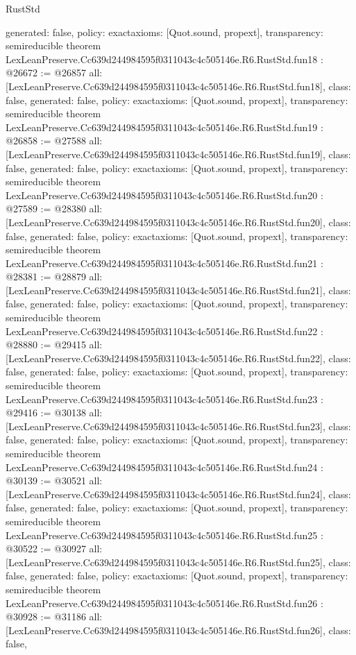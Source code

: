 \begin{lexlean}{RustStd}
\begin{coremodule}
{  generated: false,
  policy: exact{axioms: [Quot.sound, propext]},
  transparency: semireducible
}
theorem LexLeanPreserve.Cc639d244984595f0311043c4c505146e.R6.RustStd.fun18 : @26672 := @26857 {
  all: [LexLeanPreserve.Cc639d244984595f0311043c4c505146e.R6.RustStd.fun18],
  class: false,
  generated: false,
  policy: exact{axioms: [Quot.sound, propext]},
  transparency: semireducible
}
theorem LexLeanPreserve.Cc639d244984595f0311043c4c505146e.R6.RustStd.fun19 : @26858 := @27588 {
  all: [LexLeanPreserve.Cc639d244984595f0311043c4c505146e.R6.RustStd.fun19],
  class: false,
  generated: false,
  policy: exact{axioms: [Quot.sound, propext]},
  transparency: semireducible
}
theorem LexLeanPreserve.Cc639d244984595f0311043c4c505146e.R6.RustStd.fun20 : @27589 := @28380 {
  all: [LexLeanPreserve.Cc639d244984595f0311043c4c505146e.R6.RustStd.fun20],
  class: false,
  generated: false,
  policy: exact{axioms: [Quot.sound, propext]},
  transparency: semireducible
}
theorem LexLeanPreserve.Cc639d244984595f0311043c4c505146e.R6.RustStd.fun21 : @28381 := @28879 {
  all: [LexLeanPreserve.Cc639d244984595f0311043c4c505146e.R6.RustStd.fun21],
  class: false,
  generated: false,
  policy: exact{axioms: [Quot.sound, propext]},
  transparency: semireducible
}
theorem LexLeanPreserve.Cc639d244984595f0311043c4c505146e.R6.RustStd.fun22 : @28880 := @29415 {
  all: [LexLeanPreserve.Cc639d244984595f0311043c4c505146e.R6.RustStd.fun22],
  class: false,
  generated: false,
  policy: exact{axioms: [Quot.sound, propext]},
  transparency: semireducible
}
theorem LexLeanPreserve.Cc639d244984595f0311043c4c505146e.R6.RustStd.fun23 : @29416 := @30138 {
  all: [LexLeanPreserve.Cc639d244984595f0311043c4c505146e.R6.RustStd.fun23],
  class: false,
  generated: false,
  policy: exact{axioms: [Quot.sound, propext]},
  transparency: semireducible
}
theorem LexLeanPreserve.Cc639d244984595f0311043c4c505146e.R6.RustStd.fun24 : @30139 := @30521 {
  all: [LexLeanPreserve.Cc639d244984595f0311043c4c505146e.R6.RustStd.fun24],
  class: false,
  generated: false,
  policy: exact{axioms: [Quot.sound, propext]},
  transparency: semireducible
}
theorem LexLeanPreserve.Cc639d244984595f0311043c4c505146e.R6.RustStd.fun25 : @30522 := @30927 {
  all: [LexLeanPreserve.Cc639d244984595f0311043c4c505146e.R6.RustStd.fun25],
  class: false,
  generated: false,
  policy: exact{axioms: [Quot.sound, propext]},
  transparency: semireducible
}
theorem LexLeanPreserve.Cc639d244984595f0311043c4c505146e.R6.RustStd.fun26 : @30928 := @31186 {
  all: [LexLeanPreserve.Cc639d244984595f0311043c4c505146e.R6.RustStd.fun26],
  class: false,
}
\end{coremodule}
\end{lexlean}
